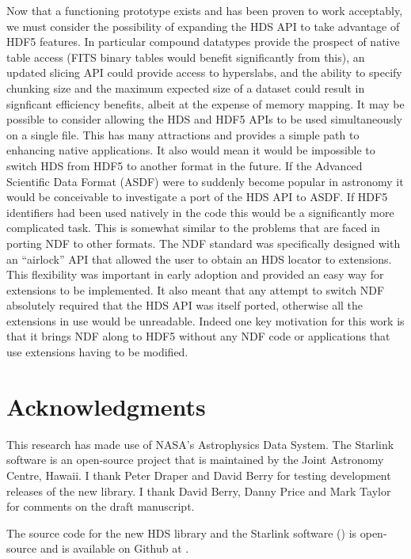 \documentclass[final,authoryear,5p,times,twocolumn]{elsarticle}
\begin{document}
Now that a functioning prototype exists and has been proven to work
acceptably, we must consider the possibility of expanding the HDS API
to take advantage of HDF5 features. In particular compound datatypes
provide the prospect of native table access (FITS binary tables would
benefit significantly from this), an updated slicing API could provide
access to hyperslabs, and the ability to specify chunking size and the
maximum expected size of a dataset could result in signficant
efficiency benefits, albeit at the expense of memory mapping. It may
be possible to consider allowing the HDS and HDF5 APIs to be used
simultaneously on a single file. This has many attractions and
provides a simple path to enhancing native applications. It also would
mean it would be impossible to switch HDS from HDF5 to another format
in the future. If the Advanced Scientific Data Format (ASDF)
\citep{asdf} were to suddenly become popular in astronomy it would be
conceivable to investigate a port of the HDS API to ASDF. If HDF5
identifiers had been used natively in the code this would be a
significantly more complicated task. This is somewhat similar to the
problems that are faced in porting NDF to other formats. The NDF
standard \citep{SGP38} was specifically designed with an ``airlock''
API that allowed the user to obtain an HDS locator to extensions. This
flexibility was important in early adoption and provided an easy way
for extensions to be implemented. It also meant that any attempt to
switch NDF absolutely required that the HDS API was itself ported,
otherwise all the extensions in use would be unreadable. Indeed one key
motivation for this work is that it brings NDF along to HDF5 without
any NDF code or applications that use extensions having to be
modified.

\section{Acknowledgments}

This research has made use of NASA's Astrophysics Data System.  The
Starlink software is an open-source project that is maintained by the
Joint Astronomy Centre, Hawaii. I thank Peter Draper and David Berry
for testing development releases of the new library. I thank David
Berry, Danny Price and Mark Taylor for comments on the draft manuscript.

The source code for the new HDS library and the Starlink software
() is open-source and is available on Github at
.
\end{document}
